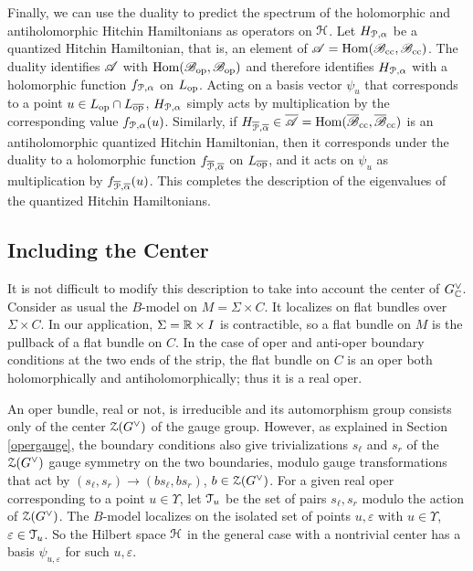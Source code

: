 \documentclass[11pt,a4paper]{article}
\begin{document}
Finally, we can use the duality to predict the spectrum of the holomorphic and antiholomorphic Hitchin Hamiltonians as operators on $\H$.  Let $H_{\P,\alpha}$
be a quantized Hitchin Hamiltonian, that is, an element of $\A=\Hom(\B_\cc,\B_\cc)$.   The duality identifies $\A$ with $\Hom(\B_\op,\B_\op)$ and therefore
identifies $H_{\P,\alpha}$ with a holomorphic function $f_{\P,\alpha}$ on $L_\op$.   Acting on a basis vector $\psi_u$ that corresponds to a point $u\in L_\op\cap
L_\bop$, $H_{\P,\alpha}$ simply acts by multiplication by the corresponding value $f_{\P,\alpha}(u)$.   Similarly, if $H_{\b\P,\b\alpha}\in \b\A=\Hom(\b\B_\cc,\b\B_\cc)$
is an antiholomorphic quantized Hitchin Hamiltonian, then it corresponds under the duality to a  holomorphic function $f_{\bar\P,\b\alpha}$
on $L_\bop$, and it acts on $\psi_u$ as multiplication by $f_{\b\P,\b\alpha}(u)$.    This completes the description of the eigenvalues of the quantized
Hitchin Hamiltonians.   

\subsection{Including the Center}\label{inccenter}

It is not difficult to modify this description to take into account the center of $G_\C^\vee$.   
Consider as usual the $B$-model on $M=\Sigma\times C$.   It localizes on flat bundles over $\Sigma\times C$. 
In our application, $\Sigma=\R\times I$ is contractible, so a flat bundle on $M$ is the pullback of a flat bundle on $C$.
In the case of oper and anti-oper boundary conditions at the two ends of the strip, the flat bundle on $C$ is an oper both
holomorphically and antiholomorphically; thus it is a real oper.

An oper bundle, real or not, is irreducible and its automorphism group consists only of the center $\zZ(G^\vee)$ of the gauge group.
However, as explained in Section \ref{opergauge}, the boundary conditions also give trivializations $s_\ell$ and $s_r$ of the $\zZ(G^\vee)$
gauge symmetry on the two boundaries, modulo gauge transformations that act by $(s_\ell, s_r)\to (b s_\ell,b s_r)$, $b\in \zZ(G^\vee)$. 
   For a given real oper corresponding to a point $u\in \Upsilon$, let $\T_u$ be the set of pairs $s_\ell,s_r$ modulo the
action of $\zZ(G^\vee)$.    
 The $B$-model localizes on the isolated set of points $u,\varepsilon$ with $u\in \Upsilon$, $\varepsilon\in \T_u$.
So the Hilbert space $\H$ in the general case with a nontrivial center has a basis $\psi_{u,\varepsilon}$ for such $u,\varepsilon$.    
\end{document}
